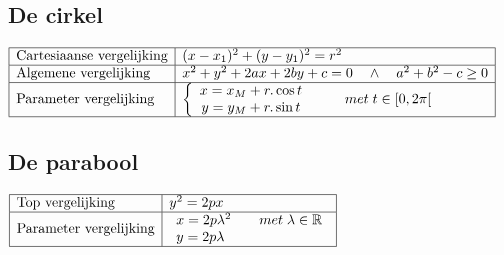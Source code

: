 \documentclass[a5paper]{article}
\begin{document}
\subsection{De cirkel}

$
\begin{array}{|l|l|}
\hline
\text{Cartesiaanse vergelijking} & {(x - {x_1})^2} + {(y - {y_1})^2} = {r^2}  \\
\hline
\text{Algemene vergelijking} & {x^2} + {y^2} + 2ax + 2by + c = 0\quad  \wedge \quad {a^2} + {b^2} - c \ge 0  \\
\hline
\text{Parameter vergelijking} & \left\{ {\begin{array}{*{20}{c}}
{x = {x_M} + r.\cos t}\\
{y = {y_M} + r.\sin t}
\end{array}} \right.\;\quad \quad met\;t \in \left[ {0,2\pi } \right[  \\
\hline
\end{array}
$

\subsection{De parabool}

$
\begin{array}{|l|l|}
\hline
\text{Top vergelijking} & {y^2} = 2px  \\
\hline
\text{Parameter vergelijking} & \begin{array}{l}
x = 2p{\lambda ^2}\quad \quad met\;\lambda  \in \mathbb {R} \\
y = 2p\lambda 
\end{array}  \\
\hline
\end{array}
$
\end{document}
